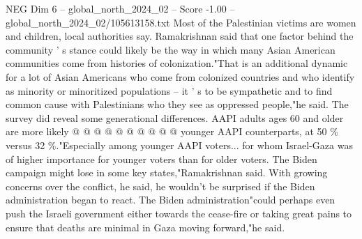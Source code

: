 \begin{textsample}{NEG Dim 6 – global\_north\_2024\_02 – Score -1.00 – global\_north\_2024\_02/105613158.txt}
Most of the Palestinian victims are women and children, local authorities say.
Ramakrishnan said that one factor behind the community ' s stance could likely be the way in which many Asian American communities come from histories of colonization."That is an additional dynamic for a lot of Asian Americans who come from colonized countries and who identify as minority or minoritized populations -- it ' s to be sympathetic and to find common cause with Palestinians who they see as oppressed people,"he said.
The survey did reveal some generational differences.
AAPI adults ages 60 and older are more likely @ @ @ @ @ @ @ @ @ @ younger AAPI counterparts, at 50 \% versus 32 \%."Especially among younger AAPI voters... for whom Israel-Gaza was of higher importance for younger voters than for older voters.
The Biden campaign might lose in some key states,"Ramakrishnan said.
With growing concerns over the conflict, he said, he wouldn't be surprised if the Biden administration began to react.
The Biden administration"could perhaps even push the Israeli government either towards the cease-fire or taking great pains to ensure that deaths are minimal in Gaza moving forward,"he said.

\end{textsample}
